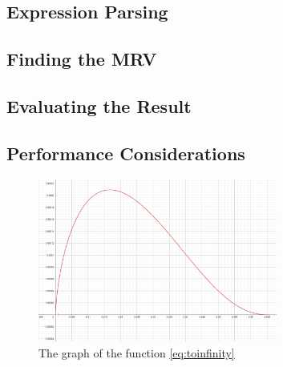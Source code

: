 \documentclass{article}
\theoremstyle{plain}
\theoremstyle{definition}
\begin{document}
	\subsection{Expression Parsing}
	
	\subsection{Finding the MRV}
	
	\subsection{Evaluating the Result}
	
	\subsection{Performance Considerations}
	
	\newpage
	\printbibliography
	
	\newpage
	\appendix
	\begin{figure}
		\centering
		\includegraphics[width=0.7\textwidth]{img/limoff1.PNG}
		\caption{The graph of the function \eqref{eq:toinfinity}}\label{fig:limoff1}
	\end{figure}
	
\end{document}
